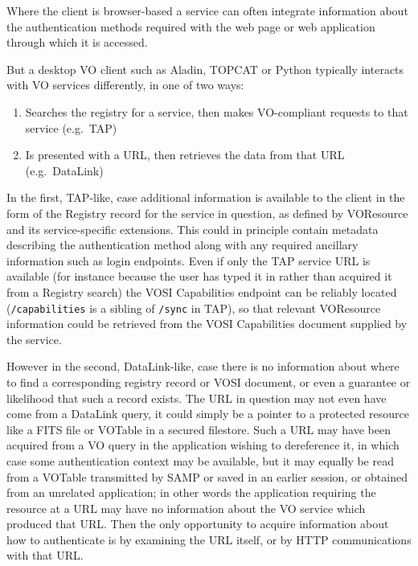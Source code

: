 \documentclass[11pt,a4paper]{ivoa}
\begin{document}
Where the client is browser-based
a service can often integrate information about the authentication
methods required with the web page or web application through which
it is accessed.

But a desktop VO client such as Aladin, TOPCAT or Python
typically interacts with VO services differently, in one of two
ways:
\begin{enumerate}
\item Searches the registry for a service, then makes VO-compliant
      requests to that service (e.g.\ TAP)
\item Is presented with a URL, then retrieves the data from that URL
      (e.g.\ DataLink)
\end{enumerate}
In the first, TAP-like, case additional information is available to the
client in the form of the Registry record for the service in question,
as defined by VOResource \citep{2008ivoa.spec.0222P}
and its service-specific extensions.
This could in principle contain metadata describing the authentication
method along with any required ancillary information such as
login endpoints.
Even if only the TAP service URL is available
(for instance because the user has typed it in rather than acquired it
from a Registry search) the VOSI Capabilities endpoint can be reliably
located ({\tt /capabilities} is a sibling of {\tt /sync} in TAP),
so that relevant VOResource information could be retrieved from the VOSI
Capabilities document supplied by the service.

However in the second, DataLink-like, case
there is no information about where to find a corresponding
registry record or VOSI document,
or even a guarantee or likelihood that such a record exists.
The URL in question may not even have come from a DataLink query,
it could simply be a pointer to a protected resource like a
FITS file or VOTable in a secured filestore.
Such a URL may have been acquired from a VO query in the application
wishing to dereference it, in which case some authentication context
may be available,
but it may equally be read from a VOTable transmitted by SAMP
or saved in an earlier session, or obtained from an unrelated application;
in other words the application requiring the resource at a URL may
have no information about the VO service which produced that URL.
Then the only opportunity to acquire information about how to authenticate
is by examining the URL itself, or by HTTP communications with that URL.
\end{document}
